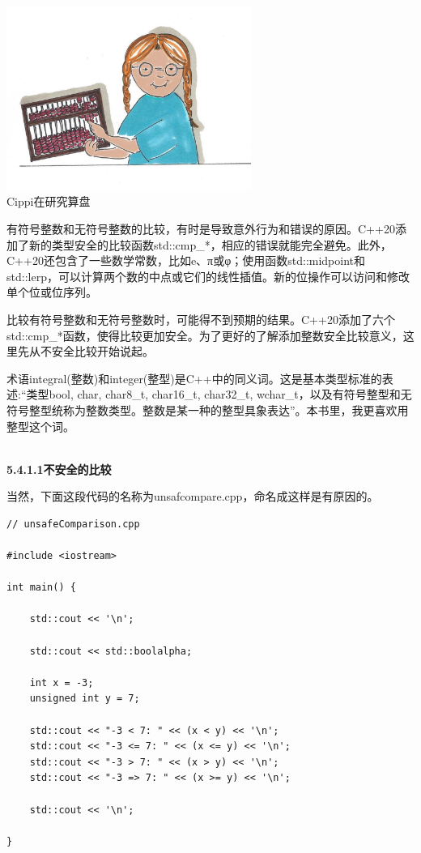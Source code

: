 \begin{center}
\includegraphics[width=0.6\textwidth]{content/3/chapter5/images/15.png}\\
Cippi在研究算盘
\end{center}

有符号整数和无符号整数的比较，有时是导致意外行为和错误的原因。C++20添加了新的类型安全的比较函数std::cmp\_*，相应的错误就能完全避免。此外，C++20还包含了一些数学常数，比如e、π或φ；使用函数std::midpoint和std::lerp，可以计算两个数的中点或它们的线性插值。新的位操作可以访问和修改单个位或位序列。


比较有符号整数和无符号整数时，可能得不到预期的结果。C++20添加了六个std::cmp\_*函数，使得比较更加安全。为了更好的了解添加整数安全比较意义，这里先从不安全比较开始说起。

\begin{tcolorbox}[breakable,enhanced jigsaw,colback=blue!5!white,colframe=blue!75!black,title={整数与整型}]
	
术语integral(整数)和integer(整型)是C++中的同义词。这是基本类型标准的表述:“类型bool, char, char8\_t, char16\_t, char32\_t, wchar\_t，以及有符号整型和无符号整型统称为整数类型。整数是某一种的整型具象表达”。本书里，我更喜欢用整型这个词。
	
\end{tcolorbox}

\hspace*{\fill} \\ %
\noindent
\textbf{5.4.1.1\hspace{0.2cm}不安全的比较}

当然，下面这段代码的名称为unsafcompare.cpp，命名成这样是有原因的。

\begin{lstlisting}[style=styleCXX]
// unsafeComparison.cpp

#include <iostream>

int main() {
	
	std::cout << '\n';
	
	std::cout << std::boolalpha;
	
	int x = -3;
	unsigned int y = 7;
	
	std::cout << "-3 < 7: " << (x < y) << '\n';
	std::cout << "-3 <= 7: " << (x <= y) << '\n';
	std::cout << "-3 > 7: " << (x > y) << '\n';
	std::cout << "-3 => 7: " << (x >= y) << '\n';
	
	std::cout << '\n';

}
\end{lstlisting}


